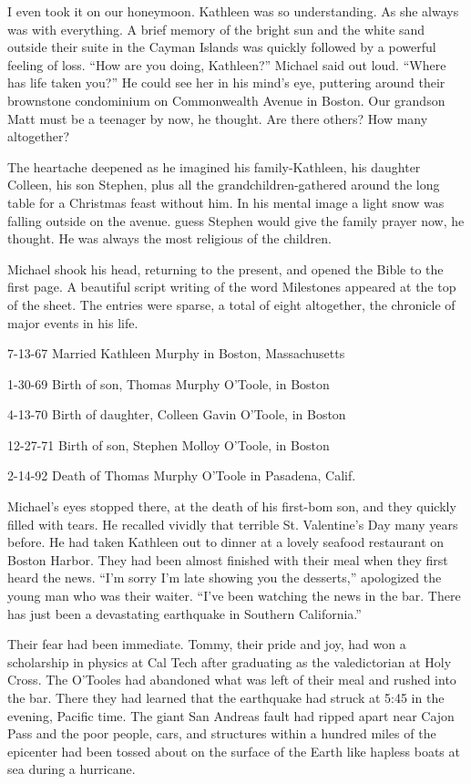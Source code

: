\documentclass[]{article}
\begin{document}
{I even took it on our honeymoon.  Kathleen was so understanding.  As she always was with everything.  A brief memory of the bright sun and the white sand outside their suite in the Cayman Islands was quickly followed by a powerful feeling of loss.  “How are you doing, Kathleen?” Michael said out loud.  “Where has life taken you?” He could see her in his mind’s eye, puttering around their brownstone condominium on Commonwealth Avenue in Boston.  Our grandson Matt must be a teenager by now, he thought.  Are there others? How many altogether?

The heartache deepened as he imagined his family-Kathleen, his daughter Colleen, his son Stephen, plus all the grandchildren-gathered around the long table for a Christmas feast without him.  In his mental image a light snow was falling outside on the avenue.  guess Stephen would give the family prayer now, he thought.  He was always the most religious of the children.

Michael shook his head, returning to the present, and opened the Bible to the first page.  A beautiful script writing of the word Milestones appeared at the top of the sheet.  The entries were sparse, a total of eight altogether, the chronicle of major events in his life.

7-13-67 Married Kathleen Murphy in Boston, Massachusetts

1-30-69 Birth of son, Thomas Murphy O’Toole, in Boston

4-13-70 Birth of daughter, Colleen Gavin O’Toole, in Boston

12-27-71 Birth of son, Stephen Molloy O’Toole, in Boston

2-14-92 Death of Thomas Murphy O’Toole in Pasadena, Calif.

Michael’s eyes stopped there, at the death of his first-bom son, and they quickly filled with tears.  He recalled vividly that terrible St.  Valentine’s Day many years before.  He had taken Kathleen out to dinner at a lovely seafood restaurant on Boston Harbor.  They had been almost finished with their meal when they first heard the news.  “I’m sorry I’m late showing you the desserts,” apologized the young man who was their waiter.  “I’ve been watching the news in the bar.  There has just been a devastating earthquake in Southern California.”

Their fear had been immediate.  Tommy, their pride and joy, had won a scholarship in physics at Cal Tech after graduating as the valedictorian at Holy Cross.  The O’Tooles had abandoned what was left of their meal and rushed into the bar.  There they had learned that the earthquake had struck at 5:45 in the evening, Pacific time.  The giant San Andreas fault had ripped apart near Cajon Pass and the poor people, cars, and structures within a hundred miles of the epicenter had been tossed about on the surface of the Earth like hapless boats at sea during a hurricane.

}
\end{document}
